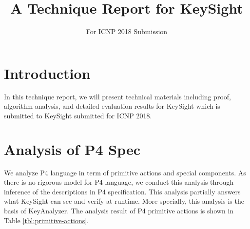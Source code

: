 \documentclass[sigconf]{acmart}
\begin{document}
\title{A Technique Report for KeySight}

\subtitle{For ICNP 2018 Submission}


\renewcommand{\shortauthors}{Anonymous Authors}
\newcommand{\start}[1]{\vspace{5pt}\noindent\textbf{#1}}
\newcommand{\ie}{\emph{i.e.,}}
\newcommand{\eg}{\emph{e.g.,}}
\newcommand{\etal}{\emph{et al.}\xspace}

\maketitle


\section{Introduction}

In this technique report, we will present technical materials including proof, algorithm analysis, and detailed evaluation results for KeySight which is submitted to KeySight submitted for ICNP 2018.




\section{Analysis of P4 Spec}
We analyze P4 \cite{p4} language in term of primitive actions and special components. As there is no rigorous model for P4 language, we conduct this analysis through inference of the descriptions in P4 specification. This analysis partially answers what KeySight can see and verify at runtime. More specially, this analysis is the basis of KeyAnalyzer. The analysis result of P4 primitive actions is shown in Table \ref{tbl:primitive-actions}.
\end{document}
